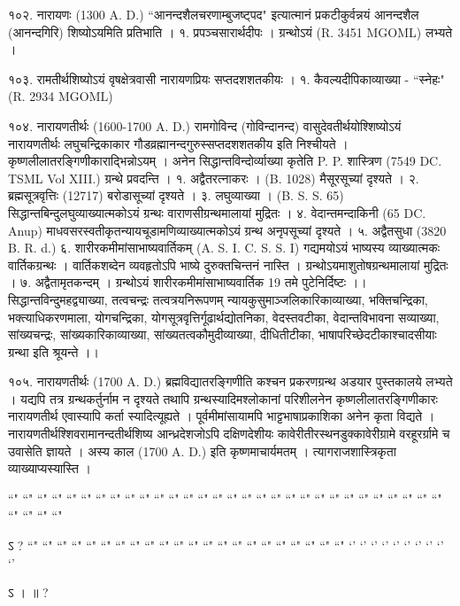 १०२. नारायणः (1300 A. D.)
``आनन्दशैलचरणाम्बुजष्ट्पद" इत्यात्मानं प्रकटीकुर्वन्नयं आनन्दशैल (आनन्दगिरि) शिष्योऽयमिति प्रतिभाति ।
१. प्रपञ्चसारार्थदीपः । ग्रन्थोऽयं (R. 3451 MGOML) लभ्यते ।

१०३.
रामतीर्थशिष्योऽयं वृषक्षेत्रवासी नारायणप्रियः सप्तदशशतकीयः ।
१. कैवल्यदीपिकाव्याख्या - ``स्नेहः" (R. 2934 MGOML)

१०४. नारायणतीर्थः (1600-1700 A. D.)
रामगोविन्द (गोविन्दानन्द) वासुदेवतीर्थयोश्शिष्योऽयं नारायणतीर्थः लघुचन्द्रिकाकार गौडव्रह्मानन्दगुरुस्सप्तदशशतकीय इति निश्चीयते । कृष्णलीलातरङ्गिणीकाराद्भिन्नोऽयम् । अनेन सिद्धान्तविन्दोर्व्याख्या कृतेति P. P. शास्त्रिण (7549 DC. TSML Vol XIII.) ग्रन्थे प्रवदन्ति ।
१. अद्वैतरत्नाकरः । (B. 1028) मैसूरसूच्यां दृश्यते ।
२. ब्रह्मसूत्रवृत्तिः (12717) बरोडासूच्यां दृश्यते ।
३. लघुव्याख्या । (B. S. S. 65) सिद्धान्तबिन्दुलघुव्याख्यात्मकोऽयं ग्रन्थः वाराणसीग्रन्थमालायां मुद्रितः ।
४. वेदान्तमन्दाकिनी (65 DC. Anup) माधवसरस्वतीकृतन्यायचूडामणिव्याख्यात्मकोऽयं ग्रन्थ अनृपसूच्यां दृश्यते ।
५. अद्वैतसुधा (3820 B. R. d.)
६. शारीरकमीमांसाभाष्यवार्तिकम् (A. S. I. C. S. S. I) गद्यमयोऽयं भाष्यस्य व्याख्यात्मकः वार्तिकग्रन्थः । वार्तिकशब्देन व्यवहृतोऽपि भाष्ये दुरुक्तचिन्तनं नास्ति । ग्रन्थोऽयमाशुतोषग्रन्थमालायां मुद्रितः ।
७. अद्वैतामृतकन्दम् । ग्रन्थोऽयं शारीरकमीमांसाभाष्यवार्तिक 19 तमे पुटेनिर्दिष्टः ।।
सिद्धान्तविन्दुमहद्व्याख्या, तत्वचन्द्रः तत्वत्रयनिरूपणम् न्यायकुसुमाञ्जलिकारिकाव्याख्या, भक्तिचन्द्रिका, भक्त्याधिकरणमाला, योगचन्द्रिका, योगसूत्रवृत्तिर्गूढार्थद्योतनिका, वेदस्तवटीका, वेदान्तविभावना सव्याख्या, सांख्यचन्द्रः, सांख्यकारिकाव्याख्या, सांख्यतत्वकौमुदीव्याख्या, दीधितीटीका, भाषापरिच्छेदटीकाश्चादसीयाः ग्रन्था इति श्रूयन्ते ।।

१०५. नारायणतीर्थः (1700 A. D.)
ब्रह्मविद्यातरङ्गिणीति कश्चन प्रकरणग्रन्थ अडयार पुस्तकालये लभ्यते । यद्यपि तत्र ग्रन्थकर्तुर्नाम न दृश्यते तथापि ग्रन्थस्यादिमश्लोकानां परिशीलनेन कृष्णलीलातरङ्गिणीकारः नारायणतीर्थ एवास्यापि कर्ता स्यादित्यूह्यते । पूर्वमीमांसायामपि भाट्टभाषाप्रकाशिका अनेन कृता विद्यते । नारायणतीर्थश्शिवरामानन्दतीर्थशिष्य आन्ध्रदेशजोऽपि दक्षिणदेशीयः कावेरीतीरस्थनडुक्कावेरीग्रामे वरहूरर्ग्रामे च उवासेति ज्ञायते । अस्य काल (1700 A. D.) इति कृष्णमाचार्यमतम् । त्यागराजशास्त्रिकृता व्याख्याप्यस्यास्ति ।


 ``" ``" ``" ``" ``" ``" ``" ``" ``" ``" ``" ``" ``" ``" ``" ``" ``" ``" ``" ``" ``" ``" ``" ``" ``" ``" ``" ``" ``" ``" ``" ``" ``" ``"

ऽ  ?
``" ``" ``" ``" ``" ``" ``" ``" ``" ``" ``" ``" ``" ``" ``" ``" ``" ``" ``" ``" ``" ``"
`' `' `' `' `' `' `' `' `' `' 

ऽ  ।   ॥ ?

